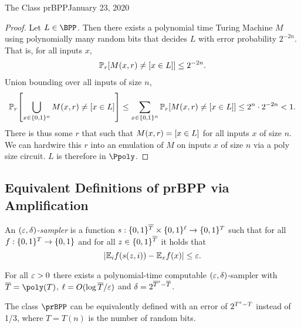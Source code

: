 \begin{lecture}{1}{The Class prBPP}{January 23, 2020}
\begin{proof}
    Let $L \in \BPP$.
    Then there exists a polynomial time Turing Machine $M$ using polynomially
	many random bits that decides $L$ with error probability $2^{-2n}$.
    That is, for all inputs $x$,
    \begin{align*}
		\Pr_r\brac*{M(x,r) \neq \brac{x \in L}} \leq 2^{-2n}.
    \end{align*}
    Union bounding over all inputs of size $n$,
	\[
		\Pr_r\brac*{\bigcup_{x \in \set{0, 1}^n} M(x,r) \neq \brac{x \in L}}
		\leq \sum_{x \in \set{0,1}^n} \Pr_r\brac*{M(x,r) \neq \brac{x \in L}}
		\leq 2^n \cdot 2^{-2n} < 1.
	\]
	There is thus some $r$ that such that $M(x,r) = \brac*{x \in L}$ for all
	inputs $x$ of size $n$.
    We can hardwire this $r$ into an emulation of $M$ on inputs $x$ of size
	$n$ via a poly size circuit.
    $L$ is therefore in $\Ppoly$.
\end{proof}

\subsection{Equivalent Definitions of prBPP via Amplification}


\begin{definition}
  An \emph{$(\eps, \delta)$-sampler} is a function $s :
  \set{0,1}^{\overline{T}} \times \set{0,1}^\ell \to \set{0,1}^T$ such that for
  all $f : \set{0,1}^T \to \set{0,1}$ and for all $z \in
  \set{0,1}^{\overline{T}}$ it holds that \[
    |\Exp_i f(s(z, i)) - \Exp_x f(x)| \le \eps.
  \]
\end{definition}

\begin{theorem}
  For all $\eps > 0$ there exists a polynomial-time computable $(\eps,
  \delta)$-sampler with $\overline{T} = \poly(T)$, $\ell = O(\log
  \overline{T}/\eps)$ and $\delta = 2^{\overline{T}^\eps - \overline{T}}$.
\end{theorem}

\begin{corollary}
  The class $\prBPP$ can be equivalently defined with an error of $2^{T^\eps -
  T}$ instead of 1/3, where $T = T(n)$ is the number of random bits.
\end{corollary}



\end{lecture}
